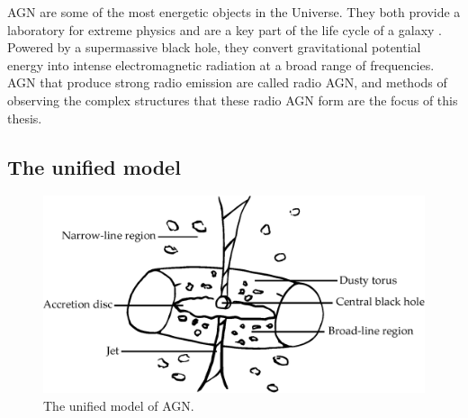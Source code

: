     AGN are some of the most energetic objects in the Universe. They both provide a laboratory for extreme physics and are a key part of the life cycle of a galaxy \citep{heckman_coevolution_2014}. Powered by a supermassive black hole, they convert gravitational potential energy into intense electromagnetic radiation at a broad range of frequencies. AGN that produce strong radio emission are called radio AGN, and methods of observing the complex structures that these radio AGN form are the focus of this thesis.

    \subsection{The unified model}
    \label{sec:unified-model}

        \begin{figure}
            \centering
            \includegraphics[width=\textwidth]{images/agn.eps}
            \caption{\label{fig:agn} The unified model of AGN.}
        \end{figure}

